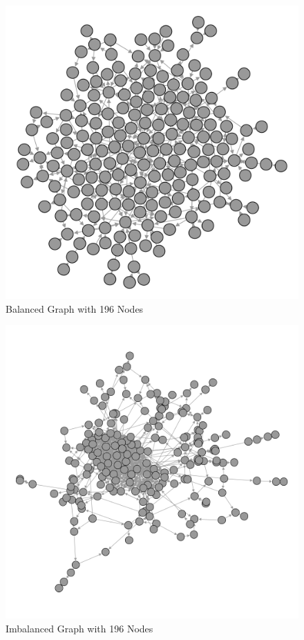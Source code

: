 \documentclass[]{report}
\begin{document}
\begin{figure}
\begin{center}
\includegraphics[scale=0.25]{non-crunch.png}
\end{center}
\caption{Balanced Graph with 196 Nodes}
\label{img:ex-noncrunch}
\end{figure}

\begin{figure}
\begin{center}
\includegraphics[scale=0.25]{crunched.png}
\end{center}
\caption{Imbalanced Graph with 196 Nodes}
\label{img:ex-crunch}
\end{figure}
\end{document}
